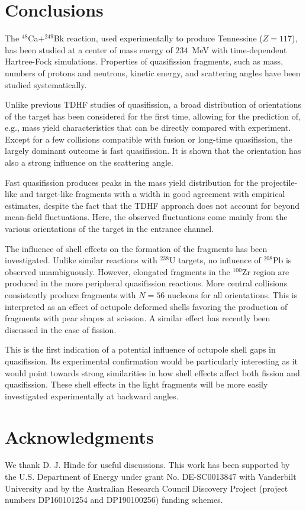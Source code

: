 \section{Conclusions}\label{cabk:sec:conclusion}

The $^{48}$Ca$+^{249}$Bk reaction, used experimentally to produce Tennessine ($Z=117$), has been studied at a center of mass energy of $234$~MeV with time-dependent Hartree-Fock simulations.
Properties of quasifission fragments, such as mass, numbers of protons and neutrons, kinetic energy, and scattering angles have been studied systematically.

Unlike previous TDHF studies of quasifission, a broad distribution of orientations of the target has been considered for the first time, allowing for the prediction of, e.g.,  mass yield characteristics that can be directly compared with experiment.
Except for a few collisions compatible with fusion or long-time quasifission, the largely dominant outcome is fast quasifission.
It is shown that the orientation has also a strong influence on the scattering angle.

Fast quasifission produces peaks in the mass yield distribution for the projectile-like and target-like fragments with a width in good agreement with empirical estimates, despite the fact that the TDHF approach does not account for beyond mean-field fluctuations.
Here, the observed fluctuations come mainly from the various orientations of the target in the entrance channel.

The influence of shell effects on the formation of the fragments has been investigated.
Unlike similar reactions with $^{238}$U targets, no influence of $^{208}$Pb is observed unambiguously.
However, elongated fragments in the $^{100}$Zr region are produced in the more peripheral quasifission reactions.
More central collisions consistently produce fragments with $N=56$ nucleons for all orientations.
This is interpreted as an effect of octupole deformed shells favoring the production of fragments with pear shapes at scission.
A similar effect has recently been discussed in the case of fission.

This is the first indication of a potential influence of octupole shell gaps in quasifission.
Its experimental confirmation would be particularly interesting as it would point towards strong similarities in how shell effects affect both fission and quasifission.
These shell effects in the light fragments will be more easily investigated experimentally at backward angles.


\section*{Acknowledgments}
	We thank D. J. Hinde for useful discussions.
	This work has been supported by the U.S. Department of Energy under grant No.
	DE-SC0013847 with Vanderbilt University and by the
	Australian Research Council Discovery Project (project numbers DP160101254 and DP190100256) funding schemes.


\clearpage

